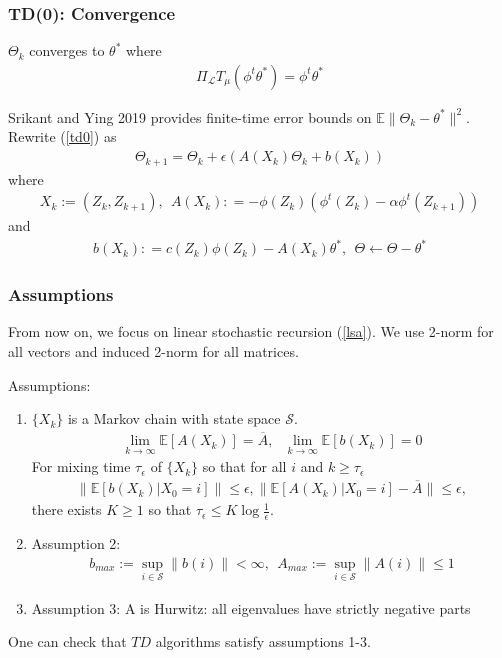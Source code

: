 \documentclass[t,10pt]{beamer}
\newcommand{\E}{\mathbb{E}}
\theoremstyle{remark}
\begin{document}
\begin{frame}
\frametitle{TD(0): Convergence}
\begin{theorem}
$\Theta_k$ converges to $\theta^*$ where 
\begin{align} 
\Pi_{\mathcal{L}} T_\mu(\phi^t \theta^*)  = \phi^t \theta^*
\end{align}
\end{theorem}

Srikant and Ying 2019 provides finite-time error bounds on $\E\|\Theta_k-\theta^*\|^2$. Rewrite (\ref{td0}) as 
\begin{align} 
\Theta_{k+1} = \Theta_k + \epsilon(A(X_k) \Theta_k + b(X_k))
\end{align} 
where
\begin{align}
X_k := (Z_k, Z_{k+1}),\ \ A(X_k): = -\phi(Z_k)(\phi^t(Z_k)-\alpha \phi^t(Z_{k+1}))
\end{align}
and
\begin{align}
b(X_k): = c(Z_k)\phi(Z_k)-A(X_k) \theta^*,  \ \ \Theta \leftarrow \Theta- \theta^*
\end{align}
\end{frame}




\begin{frame}
\frametitle{Assumptions}
From now on, we focus on linear stochastic recursion (\ref{lsa}). We use 2-norm for all vectors and induced 2-norm for all matrices.

Assumptions:
\begin{enumerate}
\item $\{X_k\}$ is a Markov chain with state space $\mathcal{S}$.
\begin{align}
\lim_{k \to \infty} \E[A(X_k)] = \overline{A}, \ \ \ \lim_{k \to \infty} \E[b(X_k)] = 0
\end{align}
For mixing time $\tau_\epsilon$ of $\{X_k\}$ so that for all $i$ and $k \geq \tau_\epsilon$
\begin{align}
\| \E[b(X_k) \big|X_0 = i] \| \leq \epsilon, \|\E[A(X_k)\big| X_0 = i]-\overline{A}\| \leq \epsilon,
\end{align}
there exists $K \geq 1$ so that $\tau_\epsilon \leq K \log \frac{1}{\epsilon}$.
\item Assumption 2: 
\begin{align}
b_{max} := \sup_{i \in \mathcal{S}} \|b(i)\| <\infty, \ \ A_{max}:= \sup_{i \in \mathcal{S}} \|A(i)\| \leq 1
\end{align}
\item Assumption 3: A is Hurwitz: all eigenvalues have strictly negative parts
\end{enumerate}
One can check that $TD$ algorithms satisfy assumptions 1-3. 
\end{frame}
\end{document}
